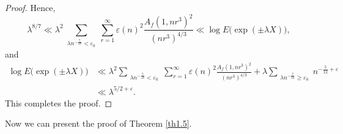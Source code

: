 \documentclass[10pt,leqno]{amsart}
\numberwithin{equation}{section}
\begin{document}
\begin{proof}
    Hence,
    \[
    \lambda^{8/7}\ll\lambda^{2}\sum_{\substack{\lambda n^{-\frac{7}{18}}<\varepsilon_0}}
    \sum_{r=1}^{\infty}\varepsilon(n)^{2}\frac{A_f(1,nr^{3})^{2}}{(nr^{3})^{4/3}}
    \ll\log E\bigl(\exp(\pm\lambda X)\bigr),
    \]
    and 
    \[
    \begin{aligned}
    \log E\bigl(\exp(\pm\lambda X)\bigr)
    &\ll\lambda^{2}\sum_{\substack{\lambda n^{-\frac{7}{18}}<\varepsilon_0}}
    \sum_{r=1}^{\infty}\varepsilon(n)^{2}\frac{A_f(1,nr^{3})^{2}}{(nr^{3})^{4/3}}
    +\lambda\sum_{\substack{\lambda n^{-\frac{7}{18}}\geq\varepsilon_0}} n^{-\frac{5}{12}+\varepsilon} \\
    &\ll \lambda^{5/2+\varepsilon}.
    \end{aligned}
    \]
    This completes the proof.
\end{proof}
Now we can present the proof of Theorem \ref{th1.5}. 
\end{document}
